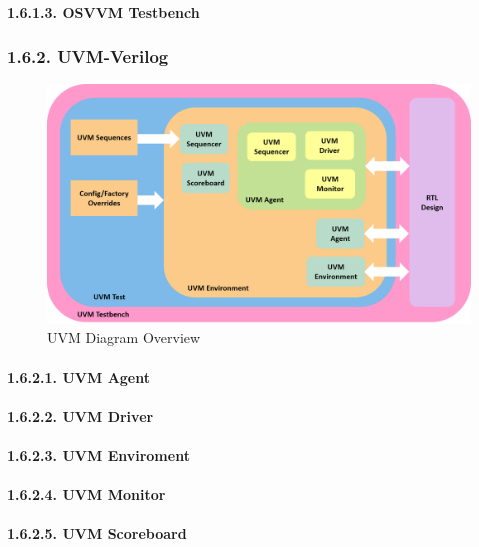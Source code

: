 \documentclass[]{article}
\let\oldparagraph\paragraph
\renewcommand{\paragraph}[1]{\oldparagraph{#1}\mbox{}}
\begin{document}
\paragraph{1.6.1.3. OSVVM Testbench}\label{osvvm-testbench}

\subsubsection{1.6.2. UVM-Verilog}\label{uvm-verilog}

\begin{figure}
\centering
\includegraphics{../bench/uvm-testbench.png}
\caption{UVM Diagram Overview}
\end{figure}

\paragraph{1.6.2.1. UVM Agent}\label{uvm-agent}

\paragraph{1.6.2.2. UVM Driver}\label{uvm-driver}

\paragraph{1.6.2.3. UVM Enviroment}\label{uvm-enviroment}

\paragraph{1.6.2.4. UVM Monitor}\label{uvm-monitor}

\paragraph{1.6.2.5. UVM Scoreboard}\label{uvm-scoreboard}
\end{document}
